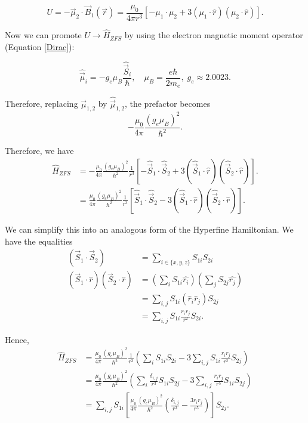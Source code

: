 \documentclass[svgnames]{article}
\begin{document}
\[
U = -\vec{\mu}_2 \cdot \vec{B}_1(\vec{r}) = \frac{\mu_0}{4\pi r^3}\left[-\mu_1
\cdot \mu_2 +  3(\mu_1 \cdot \hat{r}) (\mu_2 \cdot \hat{r}) \right]. 
\] \vspace{3px}

Now we can promote $U \rightarrow \hat{H}_{ZFS}$ by using the electron magnetic
moment operator (Equation \ref{Dirac}): 

\[
    \hat{\vec{\mu}}_i = -g_e \mu_B \frac{\hat{\vec{S}}_i}{\hbar}, \quad \mu_B =
    \frac{e\hbar}{2m_e}, \; g_e \approx 2.0023. 
\] \vspace{3px}

Therefore, replacing $\vec{\mu}_{1,2}$ by $\hat{\vec{\mu}}_{1,2}$, the prefactor
becomes  
\[ -\frac{\mu_0}{4\pi} \frac{(g_e \mu_B)^2}{\hbar^2}. \] 

Therefore, we have 
\begin{align*}
    \hat{H}_{ZFS} &= -\frac{\mu_0}{4\pi}\frac{(g_e\mu_B)^2}{\hbar^2}\frac{1}{r^3}
    \left[ -\hat{\vec{S}}_1 \cdot \hat{\vec{S}}_2 + 3(\hat{\vec{S}}_1 \cdot
    \hat{r}) (\hat{\vec{S}}_2 \cdot \hat{r}) \right]. \\ 
                  &= \frac{\mu_0}{4\pi}\frac{(g_e \mu_B)^2}{\hbar^2}
                  \frac{1}{r^3}\left[\hat{\vec{S}}_1 \cdot \hat{\vec{S}}_2 -
                      3(\hat{\vec{S}}_1 \cdot \hat{r})(\hat{\vec{S}}_2 \cdot
                  \hat{r})\right]. 
\end{align*} \vspace{3px}

We can simplify this into an analogous form of the Hyperfine Hamiltonian. 
We have the equalities
\begin{align*}
    (\vec{S}_1 \cdot \vec{S}_2) &= \sum_{i\in \{x, y, z\}} S_{1i}S_{2i} \\ 
    (\vec{S}_1 \cdot \hat{r})(\vec{S}_2 \cdot \hat{r}) &= \left(\sum_i
    S_{1i}\hat{r_i}\right)\left(\sum_j S_{2j}\hat{r_j}\right)\\ &= \sum_{i,j}S_{1i}(\hat{r}_i
    \hat{r}_j)S_{2j}\\ &= \sum_{i,j} S_{1i}\frac{r_ir_j}{r^2}S_{2i}. 
\end{align*}

Hence, 
\begin{align*}
    \hat{H}_{ZFS} &= \frac{\mu_0}{4\pi}\frac{(g_e\mu_B)^2}{\hbar^2}
    \frac{1}{r^3} \left( \sum_{i}^{} S_{1i}S_{2i} -
    3\sum_{i,j}S_{1i}\frac{r_ir_j}{r^2}S_{2j} \right) \\
                  &= \frac{\mu_0}{4\pi}\frac{(g_e\mu_B)^2}{\hbar^2}\left( \sum_i
                  \frac{\delta_{i,j}}{r^3}S_{1i}S_{2j} - 3\sum_{i,j}
              \frac{r_ir_j}{r^5}S_{1i}S_{2j}\right) \\ 
                  &= \sum_{i,j} S_{1i} \left[ \frac{\mu_0}{4\pi}
                  \frac{(g_e\mu_B)^2}{\hbar^2} \left( \frac{\delta_{i,j}}{r^3} -
              \frac{3r_ir_j}{r^5}\right) \right] S_{2j}.  
\end{align*}
\end{document}
